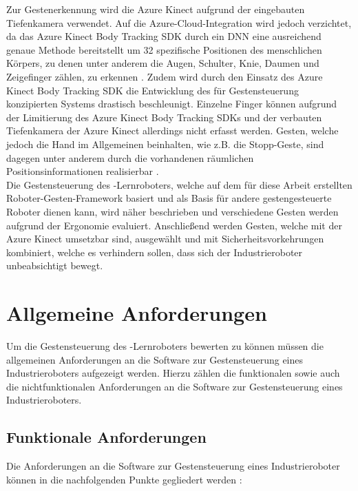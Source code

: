 Zur Gestenerkennung wird die Azure Kinect aufgrund der eingebauten Tiefenkamera verwendet. Auf die Azure-Cloud-Integration wird jedoch verzichtet, da das Azure Kinect Body Tracking SDK durch ein DNN eine ausreichend genaue Methode bereitstellt \cite{qm13_azure_kinect_release_notes_nodate} um 32 spezifische Positionen des menschlichen Körpers, zu denen unter anderem die Augen, Schulter, Knie, Daumen und Zeigefinger zählen, zu erkennen \cite{qm13_azure_joints_nodate}. Zudem wird durch den Einsatz des Azure Kinect Body Tracking SDK die Entwicklung des für Gestensteuerung konzipierten Systems drastisch beschleunigt. Einzelne Finger können aufgrund der Limitierung des Azure Kinect Body Tracking SDKs und der verbauten Tiefenkamera der Azure Kinect allerdings nicht erfasst werden. Gesten, welche jedoch die Hand im Allgemeinen beinhalten, wie z.B. die Stopp-Geste, sind dagegen unter anderem durch die vorhandenen räumlichen Positionsinformationen realisierbar \cite{microsoftazure-kinect-sensor-sdk_2020}.\\

Die Gestensteuerung des -Lernroboters, welche auf dem für diese Arbeit erstellten Roboter-Gesten-Framework basiert und als Basis für andere gestengesteuerte Roboter dienen kann, wird näher beschrieben und verschiedene Gesten werden aufgrund der Ergonomie evaluiert. Anschließend werden Gesten, welche mit der Azure Kinect umsetzbar sind, ausgewählt und mit Sicherheitsvorkehrungen kombiniert, welche es verhindern sollen, dass sich der Industrieroboter unbeabsichtigt bewegt.

\section{Allgemeine Anforderungen}
Um die Gestensteuerung des -Lernroboters bewerten zu können müssen die allgemeinen Anforderungen an die Software zur Gestensteuerung eines Industrieroboters aufgezeigt werden. Hierzu zählen die funktionalen sowie auch die nichtfunktionalen Anforderungen an die Software zur Gestensteuerung eines Industrieroboters.

\subsection{Funktionale Anforderungen}
Die Anforderungen an die Software zur Gestensteuerung eines Industrieroboter können in die nachfolgenden Punkte gegliedert werden \cite{kircher_it_2006} \cite[2\psq]{brauer_gestenerkennung_nodate}:\\

